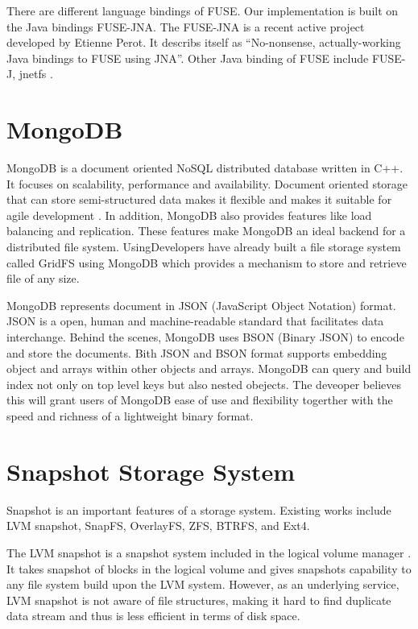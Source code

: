     There are different language bindings of FUSE. Our implementation is built on the Java bindings FUSE-JNA. The FUSE-JNA is a recent active project developed by Etienne Perot. It describs itself as ``No-nonsense, actually-working Java bindings to FUSE using JNA''. \cite{fusejna} Other Java binding of FUSE include FUSE-J, jnetfs .

\section{MongoDB}

    MongoDB is a document oriented NoSQL distributed database written in C++.\cite{mongodb} It focuses on scalability, performance and availability.\cite{mongo_overview} Document oriented storage that can store semi-structured data makes it flexible and makes it suitable for agile development \cite{docdb}. In addition, MongoDB also provides features like load balancing and replication. These features make MongoDB an ideal backend for a distributed file system. UsingDevelopers have already built a file storage system called GridFS using MongoDB which provides a mechanism to store and retrieve file of any size.\cite{gridfs}

    MongoDB represents document in JSON (JavaScript Object Notation) format. JSON is a open, human and machine-readable standard that facilitates data interchange. Behind the scenes, MongoDB uses BSON (Binary JSON) to encode and store the documents. Bith JSON and BSON format supports embedding object and arrays within other objects and arrays. MongoDB can query and build index not only on top level keys but also nested obejects. The deveoper believes this will grant users of MongoDB ease of use and flexibility togerther with the speed and richness of a lightweight binary format.\cite{bson}

\section{Snapshot Storage System}

    Snapshot is an important features of a storage system. Existing works include LVM snapshot, SnapFS, OverlayFS, ZFS, BTRFS, and Ext4.
    
    The LVM snapshot is a snapshot system included in the logical volume manager \cite{lvm}\cite{disk_perform_lvm}. It takes snapshot of blocks in the logical volume and gives snapshots capability to any file system build upon the LVM system. However, as an underlying service, LVM snapshot is not aware of file structures, making it hard to find duplicate data stream and thus is less efficient in terms of disk space.
    
